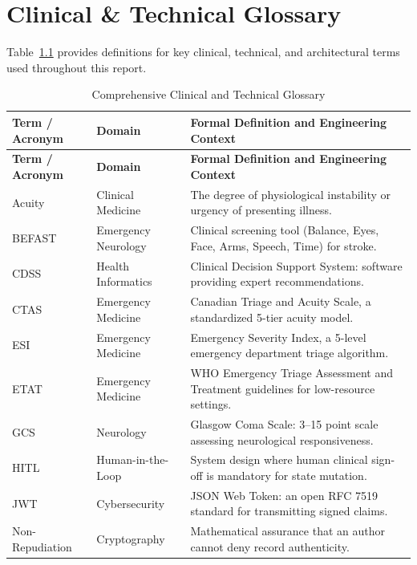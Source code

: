 \documentclass[11pt,a4paper,oneside]{report}
\begin{document}
\chapter{Clinical \& Technical Glossary}

Table~\ref{tab:glossary} provides definitions for key clinical, technical, and architectural terms used throughout this report.

\begin{longtable}{lp{3.0cm}p{7.4cm}}
  \caption{Comprehensive Clinical and Technical Glossary} \label{tab:glossary} \\
  \toprule
  \textbf{Term / Acronym} & \textbf{Domain} & \textbf{Formal Definition and Engineering Context} \\
  \midrule
  \endfirsthead
  \toprule
  \textbf{Term / Acronym} & \textbf{Domain} & \textbf{Formal Definition and Engineering Context} \\
  \midrule
  \endhead
  \bottomrule
  \endfoot
  Acuity & Clinical Medicine & The degree of physiological instability or urgency of presenting illness. \\
  BEFAST & Emergency Neurology & Clinical screening tool (Balance, Eyes, Face, Arms, Speech, Time) for stroke. \\
  CDSS & Health Informatics & Clinical Decision Support System: software providing expert recommendations. \\
  CTAS & Emergency Medicine & Canadian Triage and Acuity Scale, a standardized 5-tier acuity model. \\
  ESI & Emergency Medicine & Emergency Severity Index, a 5-level emergency department triage algorithm. \\
  ETAT & Emergency Medicine & WHO Emergency Triage Assessment and Treatment guidelines for low-resource settings. \\
  GCS & Neurology & Glasgow Coma Scale: 3--15 point scale assessing neurological responsiveness. \\
  HITL & Human-in-the-Loop & System design where human clinical sign-off is mandatory for state mutation. \\
  JWT & Cybersecurity & JSON Web Token: an open RFC 7519 standard for transmitting signed claims. \\
  Non-Repudiation & Cryptography & Mathematical assurance that an author cannot deny record authenticity. \\

\end{longtable}
\end{document}
